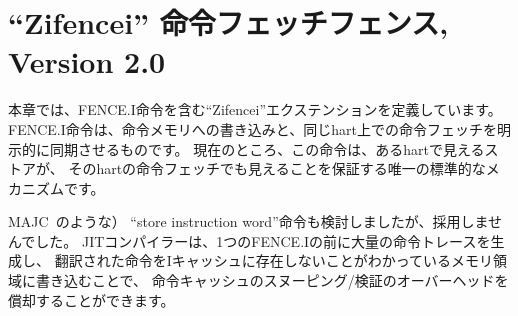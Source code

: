 \begin{comment}
\chapter{``Zifencei'' Instruction-Fetch Fence, Version 2.0}
\end{comment}
\chapter{``Zifencei'' 命令フェッチフェンス, Version 2.0}

\label{chap:zifencei}

\begin{comment}
This chapter defines the ``Zifencei'' extension, which includes the
FENCE.I instruction that provides explicit synchronization between
writes to instruction memory and instruction fetches on the same hart.
Currently, this instruction is the only standard mechanism to ensure
that stores visible to a hart will also be visible to its instruction
fetches.
\end{comment}

本章では、FENCE.I命令を含む``Zifencei''エクステンションを定義しています。
FENCE.I命令は、命令メモリへの書き込みと、同じhart上での命令フェッチを明示的に同期させるものです。
現在のところ、この命令は、あるhartで見えるストアが、
そのhartの命令フェッチでも見えることを保証する唯一の標準的なメカニズムです。

\begin{commentary}
\begin{comment}
We considered but did not include a ``store instruction word''
instruction (as in MAJC~\cite{majc}).  JIT compilers may generate a
large trace of instructions before a single FENCE.I, and amortize any
instruction cache snooping/invalidation overhead by writing translated
instructions to memory regions that are known not to reside in the
I-cache.
\end{comment}
MAJC~\cite{majc}のような） ``store instruction word''命令も検討しましたが、採用しませんでした。 JITコンパイラーは、1つのFENCE.Iの前に大量の命令トレースを生成し、
翻訳された命令をIキャッシュに存在しないことがわかっているメモリ領域に書き込むことで、
命令キャッシュのスヌーピング/検証のオーバーヘッドを償却することができます。
\end{commentary}

